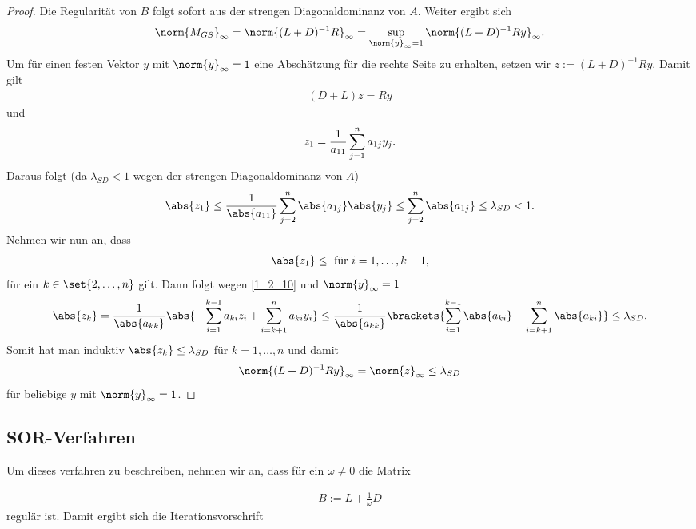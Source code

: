 \begin{proof}
	Die Regularität von $B$ folgt sofort aus der strengen Diagonaldominanz von $A$. Weiter ergibt sich
	\begin{align}
		\norm{M_{GS}}_{\infty} = \norm{(L+D)^{-1}R}_{\infty} = \sup_{\norm{y}_{\infty}=1} \norm{(L+D)^{-1}Ry}_{\infty}. \notag
	\end{align}
	Um für einen festen Vektor $y$ mit $\norm{y}_{\infty} = 1$ eine Abschätzung für die rechte Seite zu erhalten, setzen wir $z:= (L+D)^{-1}Ry$. Damit gilt
	\begin{align}
		(D+L)z = Ry \label{1_2_10}
	\end{align}
	und
	\begin{align}
	z_1 = \frac{1}{a_{11}} \sum_{j=1}^{n} a_{1j}y_j. \notag
	\end{align}
	Daraus folgt (da $\lambda_{SD} < 1$ wegen der strengen Diagonaldominanz von $A$)
	\begin{align}
		\abs{z_1} 
		\le \frac{1}{\abs{a_{11}}} \sum_{j=2}^{n} \abs{a_{1j}}\abs{y_j} 
		\le \sum_{j=2}^{n} \abs{a_{1j}} \le \lambda_{SD} < 1.\notag
	\end{align}
	Nehmen wir nun an, dass
	\begin{align}
		\abs{z_1} \le \text{ für } i = 1, \dots, k-1, \notag
	\end{align}
	für ein $k \in \set{2,\dots,n}$ gilt. Dann folgt wegen \cref{1_2_10} und $\norm{y}_{\infty} = 1$
	\begin{align}
		\abs{z_k} = \frac{1}{\abs{a_{kk}}} \abs{-\sum_{i=1}^{k-1} a_{ki}z_i + \sum_{i=k+1}^{n} a_{ki}y_i} 
		\le \frac{1}{\abs{a_{kk}}} \brackets{\sum_{i=1}^{k-1} \abs{a_{ki}} + \sum_{i=k+1}^{n} \abs{a_{ki}}} \le \lambda_{SD}. \notag
	\end{align}
	Somit hat man induktiv $\abs{z_k} \le \lambda_{SD}$ für $k = 1, \dots, n$ und damit
	\begin{align}
		\norm{(L+D)^{-1}Ry}_{\infty} = \norm{z}_{\infty} \le \lambda_{SD} \notag
	\end{align}
	für beliebige $y$ mit $\norm{y}_{\infty} = 1$.
\end{proof}

\subsection{SOR-Verfahren}

Um dieses verfahren zu beschreiben, nehmen wir an, dass für ein $\omega \neq 0$ die Matrix

\begin{align}
	B:=L + \frac{1}{\omega}D \label{eq_2_2_11}
\end{align}
regulär ist. Damit ergibt sich die Iterationsvorschrift

